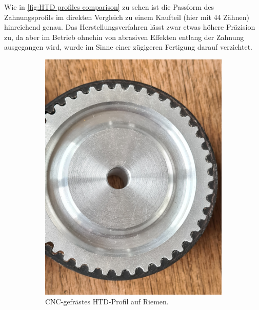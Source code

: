 		Wie in \cref{fig:HTD profiles comparison} zu sehen ist die Passform des Zahnungsprofils im direkten Vergleich zu einem Kaufteil (hier mit 44 Zähnen) hinreichend genau.
		Das Herstellungsverfahren lässt zwar etwas höhere Präzision zu, da aber im Betrieb ohnehin von abrasiven Effekten entlang der Zahnung ausgegangen wird, wurde im Sinne einer zügigeren Fertigung darauf verzichtet.
		\begin{figure}[h]
			\centering
			\begin{subfigure}{.49\textwidth}
				\centering
				\includegraphics[width=\textwidth]{Assets/Machined-HTD_tooth_fit.jpg}
				\caption{CNC-gefrästes HTD-Profil auf Riemen.}
				\label{subfig:machined HTD}
			\end{subfigure}
			\hfill
			\begin{subfigure}{.49\textwidth}
				\centering

\end{subfigure}
\end{figure}
